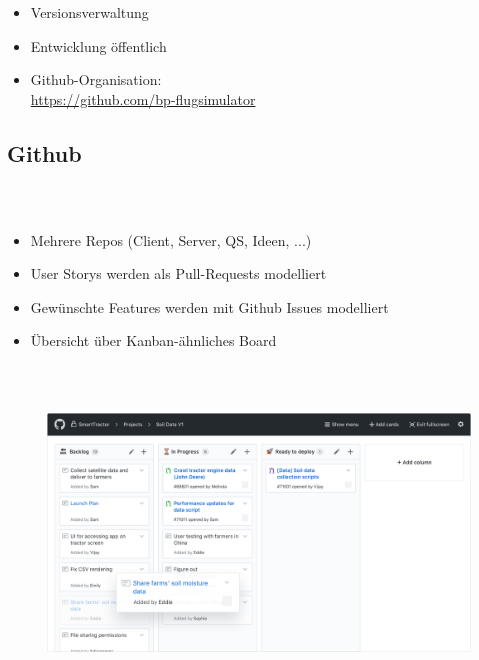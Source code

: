 \documentclass[accentcolor=tud1b,colorbacktitle,landscape,german,presentation]{tudbeamer}
\newcommand{\ftitle}{

	\frametitle{\insertsectionhead \\ {\small \insertsubsectionhead}}
}
\begin{document}
\begin{frame}
	\ftitle
	\begin{minipage}[t]{0.5\textwidth}
		\begin{itemize}
			\item Versionsverwaltung\pause
			\item Entwicklung öffentlich\pause
			\item Github-Organisation: \\\url{https://github.com/bp-flugsimulator}
		\end{itemize}
	\end{minipage}
\end{frame}

\subsection{Github}
\begin{frame}
	\ftitle
	\begin{itemize}
		\item Mehrere Repos (Client, Server, QS, Ideen, ...)\pause
		\item User Storys werden als Pull-Requests modelliert\pause
		\item Gewünschte Features werden mit Github Issues modelliert\pause
		\item Übersicht über Kanban-ähnliches Board\pause
	\end{itemize}
\end{frame}

\begin{frame}
	\ftitle
	\begin{figure}
		\centering
		\vspace{-.5cm}
		\includegraphics[scale=.2]{projects}
	\end{figure}
\end{frame}
\end{document}
